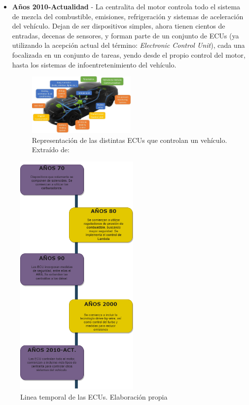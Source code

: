 \begin{itemize}
    \item \textbf{Años 2010-Actualidad} - La centralita del motor controla todo el sistema de mezcla del combustible, emisiones, refrigeración y sistemas de aceleración del vehículo. Dejan de ser dispositivos simples, ahora tienen cientos de entradas, decenas de sensores, y forman parte de un conjunto de ECUs (ya utilizando la acepción actual del término: \textit{Electronic Control Unit}), cada una focalizada en un conjunto de tareas, yendo desde el propio control del motor, hasta los sistemas de infoentretenimiento del vehículo. 
       

    \begin{figure}[h]
        \centering
        \includegraphics[width=0.5\textwidth]{imagenes/ECU_autotechdrive_completa.png}
        \caption{Representación de las distintas ECUs que controlan un vehículo. Extraído de: \cite{autotechdrive}}
    \end{figure}
\end{itemize}

\newpage
       
\begin{figure}[h]
    \centering
    \includegraphics[width=0.54\textwidth]{imagenes/timeline_ECU.png}
    \caption{Linea temporal de las ECUs. Elaboración propia}
\end{figure}


